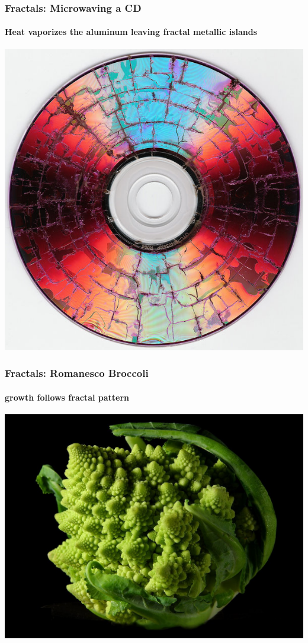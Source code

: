 \documentclass[10pt]{beamer}
\begin{document}
\begin{frame}
\frametitle{Fractals: Microwaving a CD}
\framesubtitle{Heat vaporizes the aluminum leaving fractal metallic islands}
\begin{center}
\includegraphics[height=0.9\textheight]{figs/fractal3}
\end{center}
\end{frame}
\begin{frame}
\frametitle{Fractals: Romanesco Broccoli}
\framesubtitle{growth follows fractal pattern}
\begin{center}
\includegraphics[height=0.9\textheight]{figs/fractal4}
\end{center}
\end{frame}
\end{document}
